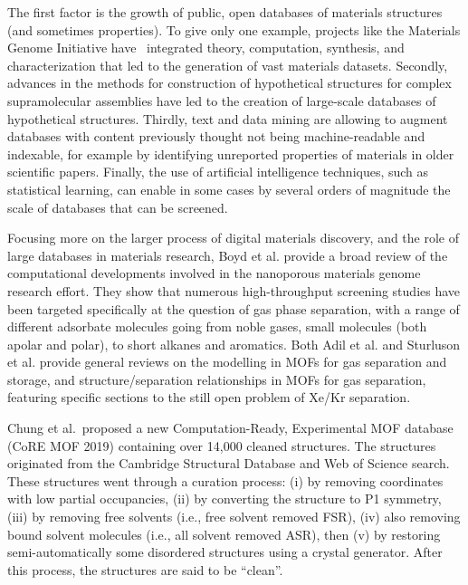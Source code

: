 \documentclass[main.tex]{subfiles}
\begin{document}
The first factor is the growth of public, open databases of materials structures (and sometimes properties).\cite{Coudert_2019} To give only one example, projects like the Materials Genome Initiative have~\cite{dePablo_2014, dePablo_2019} integrated theory, computation, synthesis, and characterization that led to the generation of vast materials datasets.\cite{Jain_2013, Jain_2016} Secondly, advances in the methods for construction of hypothetical structures for complex supramolecular assemblies have led to the creation of large-scale databases of hypothetical structures.\cite{Foster_2004, Wilmer_2013,Boyd_2016} Thirdly, text and data mining are allowing to augment databases with content previously thought not being machine-readable and indexable, for example by identifying unreported properties of materials in older scientific papers.\cite{Tshitoyan_2019, Court_2020} Finally, the use of artificial intelligence techniques, such as statistical learning,\cite{Butler_2018} can enable in some cases by several orders of magnitude the scale of databases that can be screened.\cite{Kim_2017, Borboudakis_2017, Chibani_2020}

Focusing more on the larger process of digital materials discovery, and the role of large databases in materials research,\cite{Zhou_2019} Boyd et al.\cite{Boyd_2017} provide a broad review of the computational developments involved in the nanoporous materials genome research effort. They show that numerous high-throughput screening studies have been targeted specifically at the question of gas phase separation, with a range of different adsorbate molecules going from noble gases, small molecules (both apolar and polar), to short alkanes and aromatics. Both Adil et al.\cite{Adil_2017} and Sturluson et al.\cite{Sturluson_2019} provide general reviews on the modelling in MOFs for gas separation and storage, and structure/separation relationships in MOFs for gas separation, featuring specific sections to the still open problem of Xe/Kr separation.

Chung et al.\ proposed a new Computation-Ready, Experimental MOF database (CoRE MOF 2019) containing over 14,000 cleaned structures.\cite{Chung_2019} The structures originated from the Cambridge Structural Database and Web of Science search. These structures went through a curation process: (i) by removing coordinates with low partial occupancies, (ii) by converting the structure to P1 symmetry, (iii) by removing free solvents (i.e., free solvent removed FSR), (iv) also removing bound solvent molecules (i.e., all solvent removed ASR), then (v) by restoring semi-automatically some disordered structures using a crystal generator. After this process, the structures are said to be ``clean''.
\end{document}
